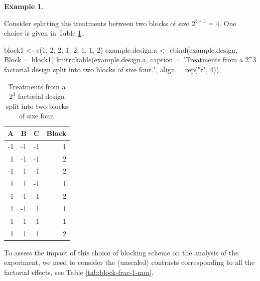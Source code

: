 \documentclass[
]{book}
\newenvironment{Shaded}{\begin{snugshade}}{\end{snugshade}}
\newcommand{\AttributeTok}[1]{\textcolor[rgb]{0.77,0.63,0.00}{#1}}
\newcommand{\DecValTok}[1]{\textcolor[rgb]{0.00,0.00,0.81}{#1}}
\newcommand{\FunctionTok}[1]{\textcolor[rgb]{0.00,0.00,0.00}{#1}}
\newcommand{\NormalTok}[1]{#1}
\newcommand{\OtherTok}[1]{\textcolor[rgb]{0.56,0.35,0.01}{#1}}
\newcommand{\SpecialCharTok}[1]{\textcolor[rgb]{0.00,0.00,0.00}{#1}}
\newcommand{\StringTok}[1]{\textcolor[rgb]{0.31,0.60,0.02}{#1}}
\theoremstyle{definition}
\theoremstyle{definition}
\newtheorem{example}{Example}[chapter]
\theoremstyle{definition}
\theoremstyle{definition}
\theoremstyle{remark}
\begin{document}
\begin{example}
\protect\hypertarget{exm:block-frac-1}{}\label{exm:block-frac-1}

Consider splitting the treatments between two blocks of size \(2^{3-1}=4\). One choice is given in Table \ref{tab:block-frac-1}.

\begin{Shaded}
\begin{Highlighting}[]
\NormalTok{block1 }\OtherTok{\textless{}{-}} \FunctionTok{c}\NormalTok{(}\DecValTok{1}\NormalTok{, }\DecValTok{2}\NormalTok{, }\DecValTok{2}\NormalTok{, }\DecValTok{1}\NormalTok{, }\DecValTok{2}\NormalTok{, }\DecValTok{1}\NormalTok{, }\DecValTok{1}\NormalTok{, }\DecValTok{2}\NormalTok{)}
\NormalTok{example.design.a }\OtherTok{\textless{}{-}} \FunctionTok{cbind}\NormalTok{(example.design, }\AttributeTok{Block =}\NormalTok{ block1)}
\NormalTok{knitr}\SpecialCharTok{::}\FunctionTok{kable}\NormalTok{(example.design.a, }\AttributeTok{caption =} \StringTok{"Treatments from a $2\^{}3$ factorial design split into two blocks of size four."}\NormalTok{, }\AttributeTok{align =} \FunctionTok{rep}\NormalTok{(}\StringTok{"r"}\NormalTok{, }\DecValTok{4}\NormalTok{))}
\end{Highlighting}
\end{Shaded}

\begin{table}

\caption{\label{tab:block-frac-1}Treatments from a $2^3$ factorial design split into two blocks of size four.}
\centering
\begin{tabular}[t]{r|r|r|r}
\hline
A & B & C & Block\\
\hline
-1 & -1 & -1 & 1\\
\hline
1 & -1 & -1 & 2\\
\hline
-1 & 1 & -1 & 2\\
\hline
1 & 1 & -1 & 1\\
\hline
-1 & -1 & 1 & 2\\
\hline
1 & -1 & 1 & 1\\
\hline
-1 & 1 & 1 & 1\\
\hline
1 & 1 & 1 & 2\\
\hline
\end{tabular}
\end{table}

To assess the impact of this choice of blocking scheme on the analysis of the experiment, we need to consider the (unscaled) contrasts corresponding to all the factorial effects, see Table \ref{tab:block-frac-1-mm}.


\end{example}
\end{document}
